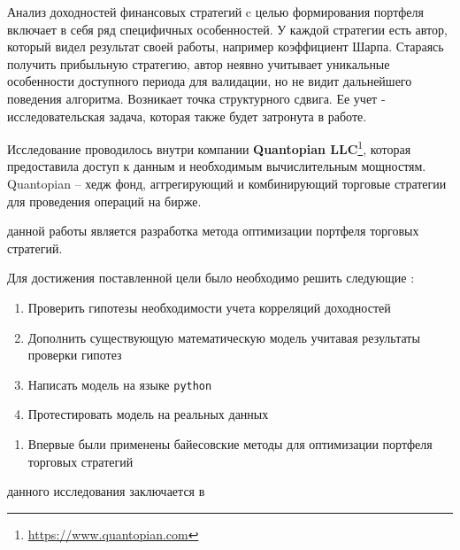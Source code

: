 Анализ доходностей финансовых стратегий c целью формирования портфеля включает в себя ряд специфичных особенностей.
У каждой стратегии есть автор, который видел результат своей работы, например коэффициент Шарпа. 
Стараясь получить прибыльную стратегию, автор неявно учитывает уникальные особенности доступного периода для валидации, но не видит дальнейшего поведения алгоритма. Возникает точка структурного сдвига. 
Ее учет - исследовательская задача, которая также будет затронута в работе.

Исследование проводилось внутри компании \textbf{Quantopian LLC}\footnote{\href{https://www.quantopian.com}{https://www.quantopian.com}}, которая предоставила доступ к данным и необходимым вычислительным мощностям. Quantopian -- хедж фонд, аггрегирующий и комбинирующий торговые стратегии для проведения операций на бирже.

{\aim} данной работы является разработка метода оптимизации портфеля торговых стратегий.

Для достижения поставленной цели было необходимо решить следующие {\tasks}:
\begin{enumerate}
  \item Проверить гипотезы необходимости учета корреляций доходностей
  \item Дополнить существующую математическую модель учитавая результаты проверки гипотез
  \item Написать модель на языке \texttt{python}
  \item Протестировать модель на реальных данных
\end{enumerate}

{\novelty}
\begin{enumerate}
  \item Впервые были применены байесовские методы для оптимизации портфеля торговых стратегий
\end{enumerate}

{\influence} данного исследования заключается в 


